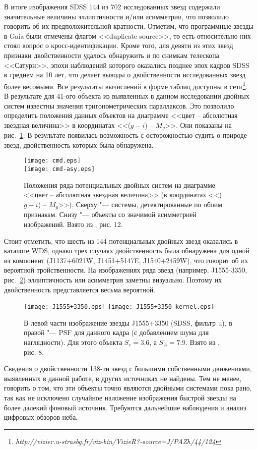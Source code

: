 В итоге изображения SDSS 144 из 702 исследованных звезд содержали значительные величины эллиптичности и/или асимметрии, что позволило говорить об их предположительной кратности. Отметим, что программные звезды в Gaia были отмечены флагом <<duplicate source>>, то есть относительно них стоял вопрос о кросс-идентификации. Кроме того, для девяти из этих звезд признаки двойственности удалось обнаружить и по снимкам телескопа <<Сатурн>>, эпохи наблюдений которого оказались позднее эпох кадров SDSS в среднем на 10 лет, что делает выводы о двойственности исследованных звезд более весомыми. Все результаты вычислений в форме таблиц доступны в сети\footnote{\textit{http://vizier.u-strasbg.fr/viz-bin/VizieR?-source=J/PAZh/44/124}}. В результате для 41-ого объекта из выявленных в данном исследовании двойных систем известны значения тригонометрических параллаксов. Это позволило определить положения данных объектов на диаграмме <<цвет -- абсолютная звездная величина>> в координатах <<($g-i$) -- $M_g$>>. Они показаны на рис.~\ref{fig:cmd}. В результате появилась возможность с осторожностью судить о природе звезд, двойственность которых была обнаружена.

\begin{figure}[pt]
\centering
\texttt{[image: cmd.eps]}\\
\texttt{[image: cmd-asy.eps]}
\caption{Положения ряда потенциальных двойных систем на диаграмме <<цвет -- абсолютная звездная величина>> (в координатах <<($g-i$) -- $M_g$>>). Сверху "--- системы, детектированные по обоим признакам. Снизу "--- объекты со значимой асимметрией изображений. Взято из \cite{2018AstL...44..103K}, рис. 12.}
\label{fig:cmd}
\end{figure}

Стоит отметить, что шесть из 144 потенциальных двойных звезд оказались в каталоге WDS, однако  трех случаях двойственность была обнаружена для одной из компонент (J1137+6021W, J1451+5147E, J1540+2459W), что говорит об их вероятной тройственности. 
На изображениях ряда звезд (например, J1555-3350, рис.~\ref{fig:J1555+3350}) эллиптичность или асимметрия заметны визуально. Поэтому их двойственность представляется весьма вероятной.
\begin{figure}[h]
\centering
\texttt{[image: J1555+3350.eps]}
\texttt{[image: J1555+3350-kernel.eps]}
\caption{В левой части изображение звезды J1555+3350 (SDSS, фильтр u), в правой "--- PSF для данного кадра (с добавлением шума для наглядности). Для этого объекта $S_e=3.6$, а $S_A=7.9$. Взято из \cite{2018AstL...44..103K}, рис. 8.}
\label{fig:J1555+3350}
\end{figure}

Сведения о двойственности 138-ти звезд с большими собственными движениями, выявленных в данной работе, в других источниках не найдены. Тем не менее, говорить о том, что эти объекты точно являются двойными системами пока рано, так как не исключено случайное наложение изображения быстрой звезды на более далекий фоновый источник. Требуются дальнейшие наблюдения и анализ цифровых обзоров неба.
